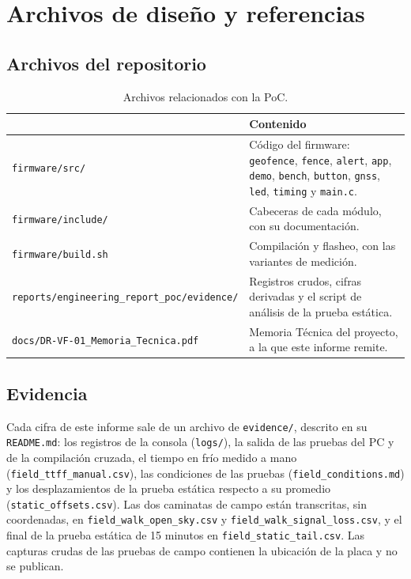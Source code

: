 \section{Archivos de diseño y referencias}

\subsection{Archivos del repositorio}

\begin{table}[H]
\centering
\small
\begin{tabularx}{\textwidth}{|l X|}
\hline
\tablehead{\textbf{Ruta} & \textbf{Contenido}} \\ \hline
\texttt{firmware/src/} & Código del firmware: \texttt{geofence}, \texttt{fence}, \texttt{alert}, \texttt{app}, \texttt{demo}, \texttt{bench}, \texttt{button}, \texttt{gnss}, \texttt{led}, \texttt{timing} y \texttt{main.c}. \\ \hline
\texttt{firmware/include/} & Cabeceras de cada módulo, con su documentación. \\ \hline
\texttt{firmware/build.sh} & Compilación y flasheo, con las variantes de medición. \\ \hline
\texttt{reports/engineering\_report\_poc/evidence/} & Registros crudos, cifras derivadas y el script de análisis de la prueba estática. \\ \hline
\texttt{docs/DR-VF-01\_Memoria\_Tecnica.pdf} & Memoria Técnica del proyecto, a la que este informe remite. \\ \hline
\end{tabularx}
\caption{Archivos relacionados con la PoC.}
\end{table}

\subsection{Evidencia}

Cada cifra de este informe sale de un archivo de \texttt{evidence/}, descrito en su \texttt{README.md}:
los registros de la consola (\texttt{logs/}), la salida de las pruebas del PC y de la compilación cruzada, el
tiempo en frío medido a mano (\texttt{field\_ttff\_manual.csv}), las condiciones de las pruebas
(\texttt{field\_conditions.md}) y los desplazamientos de la prueba estática respecto a su promedio
(\texttt{static\_offsets.csv}). Las dos caminatas de campo están transcritas, sin coordenadas, en
\texttt{field\_walk\_open\_sky.csv} y \texttt{field\_walk\_signal\_loss.csv}, y el final de la prueba estática de 15 minutos en
\texttt{field\_static\_tail.csv}. Las capturas crudas de las pruebas de campo contienen la ubicación de la placa y
no se publican.

